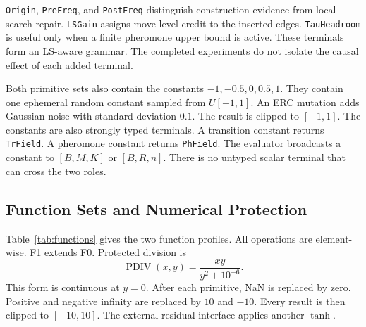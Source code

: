 \documentclass[letterpaper,journal]{IEEEtran}
\begin{document}
\texttt{Origin}, \texttt{PreFreq}, and \texttt{PostFreq} distinguish
construction evidence from local-search repair.
\texttt{LSGain} assigns move-level credit to the inserted edges.
\texttt{TauHeadroom} is useful only when a finite pheromone upper bound is
active.
These terminals form an LS-aware grammar.
The completed experiments do not isolate the causal effect of each added
terminal.

Both primitive sets also contain the constants
\(-1,-0.5,0,0.5,1\).
They contain one ephemeral random constant sampled from \(U[-1,1]\).
An ERC mutation adds Gaussian noise with standard deviation \(0.1\).
The result is clipped to \([-1,1]\).
The constants are also strongly typed terminals.
A transition constant returns \texttt{TrField}.
A pheromone constant returns \texttt{PhField}.
The evaluator broadcasts a constant to \([B,M,K]\) or \([B,R,n]\).
There is no untyped scalar terminal that can cross the two roles.

\subsection{Function Sets and Numerical Protection}

Table~\ref{tab:functions} gives the two function profiles.
All operations are element-wise.
F1 extends F0.
Protected division is
\begin{equation}
    \operatorname{PDIV}(x,y)
    =
    \frac{xy}{y^2+10^{-6}}.
    \label{eq:pdiv}
\end{equation}
This form is continuous at \(y=0\).
After each primitive, NaN is replaced by zero.
Positive and negative infinity are replaced by \(10\) and \(-10\).
Every result is then clipped to \([-10,10]\).
The external residual interface applies another \(\tanh\).
\end{document}
